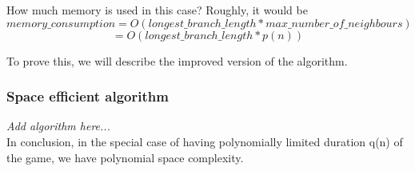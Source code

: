 How much memory is used in this case? Roughly, it would be \[ memory\_consumption =O(longest\_branch\_length * max\_number\_of\_neighbours) \] \[=O(longest\_ branch\_length*p(n))\] 

To prove this, we will describe the improved version of the algorithm.

\subsubsection*{Space efficient algorithm}

\emph{Add algorithm here...} \\

In conclusion, in the special case of having polynomially limited duration q(n) of the game, we have polynomial space 
complexity.

